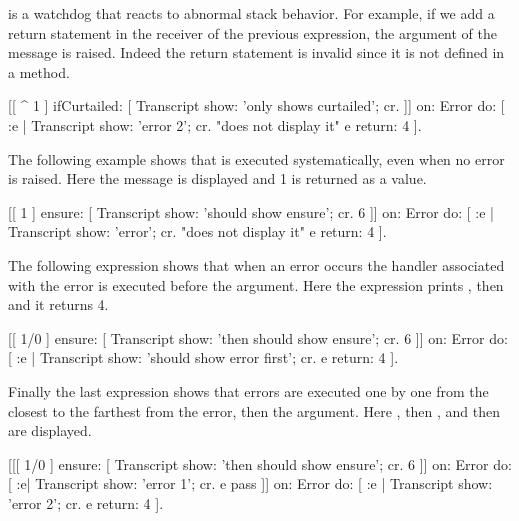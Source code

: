  is a watchdog that reacts to abnormal stack behavior.
For example, if we add a return statement in the receiver of the previous 
expression, the argument of the  message is raised.
Indeed the return statement is invalid since it is not defined in a method.

\begin{code}{}	
[[ ^ 1 ] 
		ifCurtailed: [ Transcript show: 'only shows curtailed'; cr. ]] 
	on: Error do: [ :e | 
		Transcript show: 'error 2'; cr. "does not display it" 
		e return: 4 ].
\end{code}	
	
The following example shows that  is executed systematically, even when no error is raised. Here the message  is displayed and 1 is returned as a value.
\begin{code}{}
[[ 1 ] 
		ensure: [ Transcript show: 'should show ensure'; cr. 6 ]] 
	on: Error do: [ :e | 
		Transcript show: 'error'; cr. "does not display it"
		e return: 4 ].
\end{code}	
	
	
The following expression shows that when an error occurs the handler associated with the error is executed before the  argument. Here the expression prints 	, then  and it returns 4. 

\begin{code}{}	
[[ 1/0 ] 
		ensure: [ Transcript show: 'then should show ensure'; cr. 6 ]] 
	on: Error do: [ :e | 
		Transcript show: 'should show error first'; cr. 
		e return: 4 ].
\end{code}

		
	
Finally the last expression shows that errors are executed one by one 
from the closest to the farthest from the error, then the  argument.
Here , then , and then  are displayed.
\begin{code}{}	
[[[ 1/0 ] ensure: [ Transcript show: 'then should show ensure'; cr. 6 ]] 
	on: Error do: [ :e|
				Transcript show: 'error 1'; cr.
				e pass ]] on: Error do: [ :e |
					Transcript show: 'error 2'; cr. e return: 4 ]. 

\end{code}











